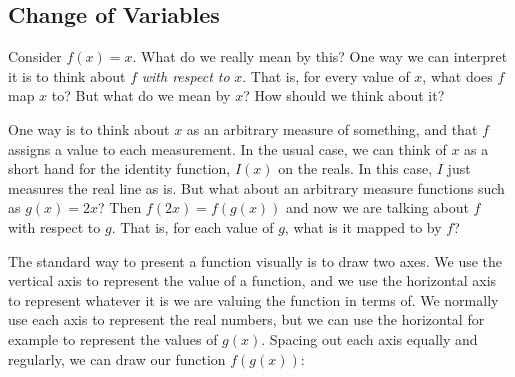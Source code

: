 \documentclass[12pt]{article}
\begin{document}
\subsection{Change of Variables}

Consider \( f(x) = x\).
What do we really mean by this?
One way we can interpret it is to think about \( f \) \emph{with respect to} \( x \).
That is, for every value of \( x \), what does \( f \) map \( x \) to?
But what do we mean by \( x \)?
How should we think about it?

One way is to think about \( x \)
as an arbitrary measure of something,
and that \( f \) assigns a value to each measurement.
In the usual case,
we can think of \( x \) as a short hand for the identity function, \( I(x) \)
on the reals.
In this case, \( I \) just measures the real line as is.
But what about an arbitrary measure functions such as \( g(x) = 2x \)?
Then \( f(2x) = f(g(x)) \) and now we are talking about \( f \) with respect to \( g \).
That is, for each value of \( g \), what is it mapped to by \( f \)?

The standard way to present a function visually is to draw two axes.
We use the vertical axis to represent the value of a function,
and we use the horizontal axis to represent
whatever it is we are valuing the function in terms of.
We normally use each axis to represent the real numbers,
but we can use the horizontal for example to represent the values of \( g(x) \).
Spacing out each axis equally and regularly, we can draw our function \( f(g(x)) \):

\end{document}
